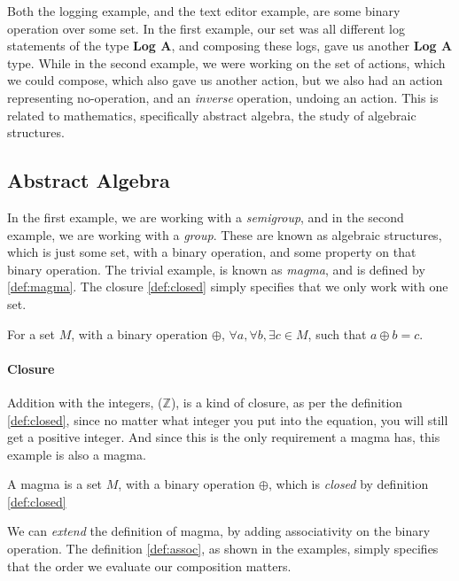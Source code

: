 Both the logging example, and the text editor example, are some binary operation
over some set. In the first example, our set was all different log statements of
the type \textbf{Log A}, and composing these logs, gave us another
\textbf{Log A} type. While in the second example, we were working on the set of
actions, which we could compose, which also gave us another action, but we also
had an action representing no-operation, and an \textit{inverse} operation,
undoing an action. This is related to mathematics, specifically abstract
algebra, the study of algebraic structures.

\subsection{Abstract Algebra}

In the first example, we are working with a \textit{semigroup}, and in the
second example, we are working with a \textit{group}. These are known as
algebraic structures, which is just some set, with a binary operation, and some
property on that binary operation. The trivial example, is known as
\textit{magma}, and is defined by \ref{def:magma}. The closure \ref{def:closed}
simply specifies that we only work with one set.

\begin{definition}[Closure] \label{def:closed}
  For a set $M$, with a binary operation $\oplus$,
  $\forall a, \forall b, \exists c \in M$, such that
  $a \oplus b = c$.
\end{definition}

\paragraph{Closure} Addition with the integers, ($\mathbb{Z}$), is a kind of
  closure, as per the definition \ref{def:closed}, since no matter what integer
  you put into the equation, you will still get a positive integer. And since
  this is the only requirement a magma has, this example is also a magma.

\begin{definition}[Magma] \label{def:magma}
  A magma is a set $M$, with a binary operation $\oplus$, which is
  \textit{closed} by definition \ref{def:closed}
\end{definition}

We can \textit{extend} the definition of magma, by adding associativity on the
binary operation. The definition \ref{def:assoc}, as shown in the examples,
simply specifies that the order we evaluate our composition matters.

